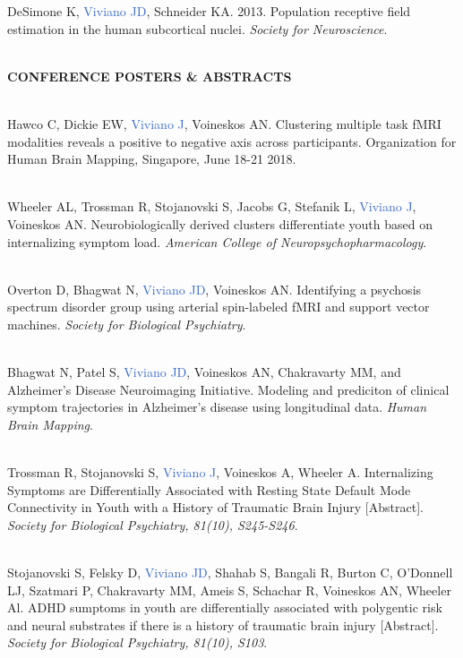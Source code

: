 \documentclass[a4paper,11pt,oneside]{book}
\newcommand\sectionheading{
    \normalsize
    \noindent
    \leftskip=0in
    \textbf
}
\begin{document}
\begin{flushleft}
DeSimone K, \textcolor{highlight}{Viviano JD}, Schneider KA. 2013. Population receptive field estimation in the human subcortical nuclei. \textit{Society for Neuroscience}. \\\

\sectionheading{CONFERENCE POSTERS \& ABSTRACTS} \\\

Hawco C, Dickie EW, \textcolor{highlight}{Viviano J}, Voineskos AN. Clustering multiple task fMRI modalities reveals a positive to negative axis across participants. Organization for Human Brain Mapping, Singapore, June 18-21 2018. \\\

Wheeler AL, Trossman R, Stojanovski S, Jacobs G, Stefanik L, \textcolor{highlight}{Viviano J}, Voineskos AN. Neurobiologically derived clusters differentiate youth based on internalizing symptom load. \textit{American College of Neuropsychopharmacology}. \\\

Overton D, Bhagwat N, \textcolor{highlight}{Viviano JD}, Voineskos AN. Identifying a psychosis spectrum disorder group using arterial spin-labeled fMRI and support vector machines. \textit{Society for Biological Psychiatry}. \\\

Bhagwat N, Patel S, \textcolor{highlight}{Viviano JD}, Voineskos AN, Chakravarty MM, and Alzheimer's Disease Neuroimaging Initiative. Modeling and prediciton of clinical symptom trajectories in Alzheimer's disease using longitudinal data. \textit{Human Brain Mapping}. \\\

Trossman R, Stojanovski S, \textcolor{highlight}{Viviano J}, Voineskos A, Wheeler A. Internalizing Symptoms are Differentially Associated with Resting State Default Mode Connectivity in Youth with a History of Traumatic Brain Injury [Abstract]. \textit{Society for Biological Psychiatry, 81(10), S245-S246}. \\\

Stojanovski S, Felsky D, \textcolor{highlight}{Viviano JD}, Shahab S, Bangali R, Burton C, O'Donnell LJ, Szatmari P, Chakravarty MM, Ameis S, Schachar R, Voineskos AN, Wheeler Al. ADHD sumptoms in youth are differentially associated with polygentic risk and neural substrates if there is a history of traumatic brain injury [Abstract]. \textit{Society for Biological Psychiatry, 81(10), S103}. \\\


\end{flushleft}
\end{document}
